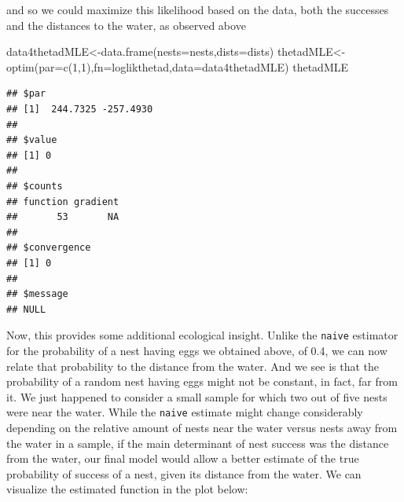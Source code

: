 \documentclass[
]{book}
\newenvironment{Shaded}{\begin{snugshade}}{\end{snugshade}}
\newcommand{\AttributeTok}[1]{\textcolor[rgb]{0.77,0.63,0.00}{#1}}
\newcommand{\DecValTok}[1]{\textcolor[rgb]{0.00,0.00,0.81}{#1}}
\newcommand{\FloatTok}[1]{\textcolor[rgb]{0.00,0.00,0.81}{#1}}
\newcommand{\FunctionTok}[1]{\textcolor[rgb]{0.00,0.00,0.00}{#1}}
\newcommand{\NormalTok}[1]{#1}
\newcommand{\OtherTok}[1]{\textcolor[rgb]{0.56,0.35,0.01}{#1}}
\newcommand{\SpecialCharTok}[1]{\textcolor[rgb]{0.00,0.00,0.00}{#1}}
\newcommand{\StringTok}[1]{\textcolor[rgb]{0.31,0.60,0.02}{#1}}
\begin{document}
and so we could maximize this likelihood based on the data, both the successes and the distances to the water, as observed above

\begin{Shaded}
\begin{Highlighting}[]
\NormalTok{data4thetadMLE}\OtherTok{\textless{}{-}}\FunctionTok{data.frame}\NormalTok{(}\AttributeTok{nests=}\NormalTok{nests,}\AttributeTok{dists=}\NormalTok{dists)}
\NormalTok{thetadMLE}\OtherTok{\textless{}{-}}\FunctionTok{optim}\NormalTok{(}\AttributeTok{par=}\FunctionTok{c}\NormalTok{(}\DecValTok{1}\NormalTok{,}\DecValTok{1}\NormalTok{),}\AttributeTok{fn=}\NormalTok{loglikthetad,}\AttributeTok{data=}\NormalTok{data4thetadMLE)}
\NormalTok{thetadMLE}
\end{Highlighting}
\end{Shaded}

\begin{verbatim}
## $par
## [1]  244.7325 -257.4930
## 
## $value
## [1] 0
## 
## $counts
## function gradient 
##       53       NA 
## 
## $convergence
## [1] 0
## 
## $message
## NULL
\end{verbatim}

Now, this provides some additional ecological insight. Unlike the \texttt{naive} estimator for the probability of a nest having eggs we obtained above, of 0.4, we can now relate that probability to the distance from the water. And we see is that the probability of a random nest having eggs might not be constant, in fact, far from it. We just happened to consider a small sample for which two out of five nests were near the water. While the \texttt{naive} estimate might change considerably depending on the relative amount of nests near the water versus nests away from the water in a sample, if the main determinant of nest success was the distance from the water, our final model would allow a better estimate of the true probability of success of a nest, given its distance from the water. We can visualize the estimated function in the plot below:

\begin{Shaded}
\end{Shaded}
\end{document}

